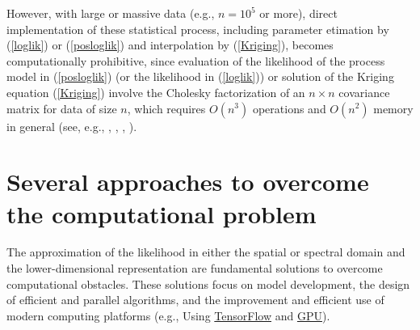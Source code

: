 \documentclass[
12pt, %
a4paper, %
oneside, %
headinclude,footinclude, %
BCOR5mm, %
]{scrartcl}
\begin{document}
However, with large or massive data (e.g., $n = 10^5$ or more), direct implementation of these statistical process, including parameter etimation by (\ref{loglik}) or (\ref{posloglik}) and interpolation by (\ref{Kriging}), becomes computationally prohibitive, since evaluation of the likelihood of the process model in (\ref{posloglik}) (or the likelihood in (\ref{loglik})) or solution of the Kriging equation (\ref{Kriging}) involve the Cholesky factorization of an $n \times n$ covariance matrix for data of size $n$, which requires $O(n^3)$ operations and $O(n^2)$ memory in general (see, e.g., \href{https://chenyw68.github.io/Literature/[2012]Advances and Challenges in Space-time Modelling of Natural Events.pdf}{\cite{porcu2012advances}}, \href{https://chenyw68.github.io/Literature/[2012]A full scale approximation of covariance functions for large spatial data sets.pdf}{\cite{sang2012full}}, \href{https://chenyw68.github.io/Literature/[2018]A case study competition among methods for analyzing large spatial data.pdf}{\cite{heaton2019case}}, \href{https://chenyw68.github.io/Literature/[2020]A Fused Gaussian Process Model for Very Large Spatial Data.pdf}{\cite{ma2020fused}}).

\section{Several approaches to overcome the computational problem}
The \textcolor[rgb]{0.50,0.50,0.50}{approximation of the likelihood in either the spatial or spectral domain} and the \textcolor[rgb]{0.50,0.50,0.50}{lower-dimensional representation} are fundamental solutions to overcome computational obstacles. These solutions focus on model development, the design of efficient and parallel algorithms, and the improvement and efficient use of modern computing platforms (e.g., Using \href{https://hpc.niasra.uow.edu.au/azm/Spatial_GPUs.html}{TensorFlow} and \href{https://github.com/cdeterman/gpuR}{GPU}).
\end{document}
